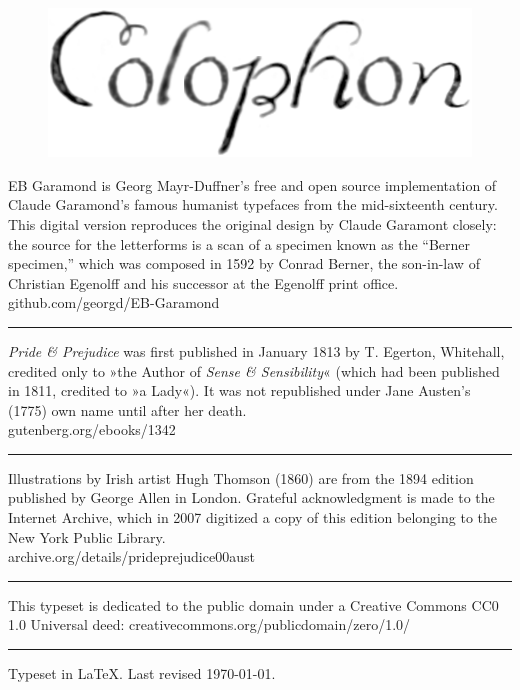 \documentclass[
paper=5.5in:8.5in,
BCOR=7mm,
twoside,
DIV=calc,
11pt,
usegeometry,
chapterprefix,
headings=big,
numbers=noenddot,
listof=flat,
listof=nochaptergap]{scrbook}
\begin{document}
\centering

\begin{figure}[t!]
\centering
\includegraphics[width=.4\linewidth]{colophon}
\end{figure}
\vspace{-2cm}

EB Garamond is Georg Mayr-Duffner's free and open source implementation of Claude Garamond’s famous humanist typefaces from the mid-sixteenth century. This digital version reproduces the original design by Claude Garamont closely: the source for the letterforms is a scan of a specimen known as the \enquote{Berner specimen,} which was composed in 1592 by Conrad Berner, the son-in-law of Christian Egenolff and his successor at the Egenolff print office.  \\github.com/georgd/EB-Garamond

\rule{0.5\textwidth}{.4pt}

\textit{Pride \& Prejudice} was first published in January 1813 by T. Egerton, Whitehall, credited only to »the Author of \textit{Sense \& Sensibility}« (which had been published in 1811, credited to »a Lady«). It was not republished under Jane Austen's (1775) own name until after her death.\\gutenberg.org/ebooks/1342

\rule{0.5\textwidth}{.4pt}

Illustrations by Irish artist Hugh Thomson (1860) are from the 1894 edition published by George Allen in London. Grateful acknowledgment is made to the Internet Archive, which in 2007 digitized a copy of this edition belonging to the New York Public Library.\\archive.org/details/prideprejudice00aust

\rule{0.5\textwidth}{.4pt}

This typeset is dedicated to the public domain under a Creative Commons CC0 1.0 Universal deed: creativecommons.org/publicdomain/zero/1.0/\\

\rule{0.5\textwidth}{.4pt}

Typeset in \LaTeX{}. Last revised \today.
\thispagestyle{empty}
\end{document}
